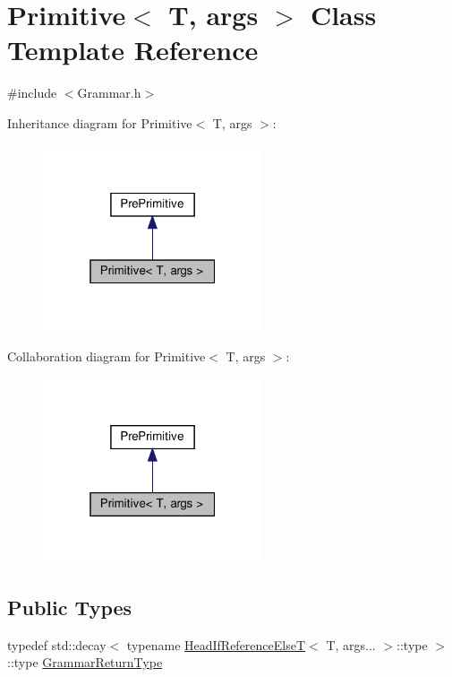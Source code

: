 \hypertarget{struct_primitive}{}\section{Primitive$<$ T, args $>$ Class Template Reference}
\label{struct_primitive}


{\ttfamily \#include $<$Grammar.\+h$>$}



Inheritance diagram for Primitive$<$ T, args $>$\+:\nopagebreak
\begin{figure}[H]
\begin{center}
\leavevmode
\includegraphics[width=184pt]{struct_primitive__inherit__graph}
\end{center}
\end{figure}


Collaboration diagram for Primitive$<$ T, args $>$\+:\nopagebreak
\begin{figure}[H]
\begin{center}
\leavevmode
\includegraphics[width=184pt]{struct_primitive__coll__graph}
\end{center}
\end{figure}
\subsection*{Public Types}
\begin{DoxyCompactItemize}
\item 
typedef std\+::decay$<$ typename \hyperlink{struct_head_if_reference_else_t}{Head\+If\+Reference\+ElseT}$<$ T, args... $>$\+::type $>$\+::type \hyperlink{struct_primitive_a1f2d2db3fb7869d03d65112e30d22101}{Grammar\+Return\+Type}
\end{DoxyCompactItemize}
